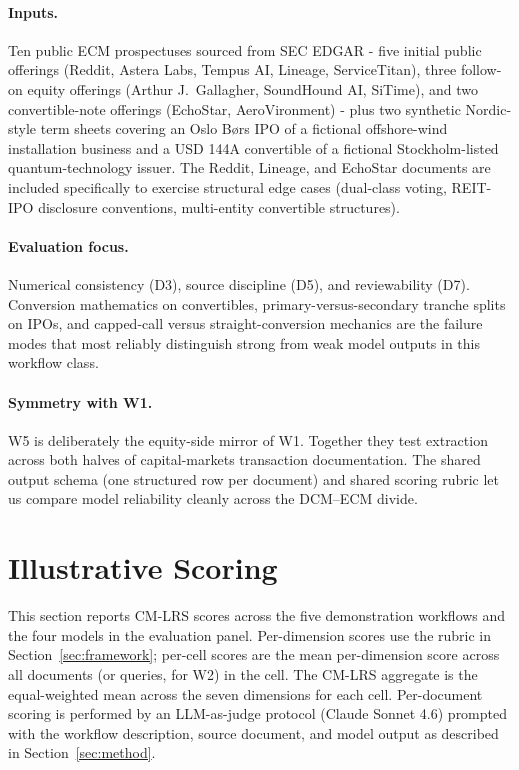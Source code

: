 \documentclass[11pt]{article}
\begin{document}
\paragraph{Inputs.} Ten public ECM prospectuses sourced from SEC EDGAR - five initial public offerings (Reddit, Astera Labs, Tempus AI, Lineage, ServiceTitan), three follow-on equity offerings (Arthur J.\ Gallagher, SoundHound AI, SiTime), and two convertible-note offerings (EchoStar, AeroVironment) - plus two synthetic Nordic-style term sheets covering an Oslo Børs IPO of a fictional offshore-wind installation business and a USD 144A convertible of a fictional Stockholm-listed quantum-technology issuer. The Reddit, Lineage, and EchoStar documents are included specifically to exercise structural edge cases (dual-class voting, REIT-IPO disclosure conventions, multi-entity convertible structures).

\paragraph{Evaluation focus.} Numerical consistency (D3), source discipline (D5), and reviewability (D7). Conversion mathematics on convertibles, primary-versus-secondary tranche splits on IPOs, and capped-call versus straight-conversion mechanics are the failure modes that most reliably distinguish strong from weak model outputs in this workflow class.

\paragraph{Symmetry with W1.} W5 is deliberately the equity-side mirror of W1. Together they test extraction across both halves of capital-markets transaction documentation. The shared output schema (one structured row per document) and shared scoring rubric let us compare model reliability cleanly across the DCM--ECM divide.

\section{Illustrative Scoring}
\label{sec:scoring}

This section reports CM-LRS scores across the five demonstration workflows and the four models in the evaluation panel. Per-dimension scores use the rubric in Section~\ref{sec:framework}; per-cell scores are the mean per-dimension score across all documents (or queries, for W2) in the cell. The CM-LRS aggregate is the equal-weighted mean across the seven dimensions for each cell. Per-document scoring is performed by an LLM-as-judge protocol (Claude Sonnet 4.6) prompted with the workflow description, source document, and model output as described in Section~\ref{sec:method}.
\end{document}

